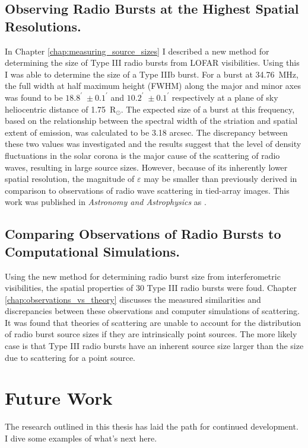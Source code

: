 \subsection{Observing Radio Bursts at the Highest Spatial Resolutions.}
In Chapter \ref{chap:measuring_source_sizes} I described a new method for determining the size of Type III radio bursts from LOFAR visibilities. Using this I was able to determine the size of a Type IIIb burst. For a burst at 34.76~MHz, the full width at half maximum height (FWHM) along the major and minor axes was found to be $18.8^\prime$~$\pm~0.1^\prime$ and $10.2^\prime$~$\pm~0.1^\prime$ respectively at a plane of sky heliocentric distance of 1.75~R$_\odot$. The expected size of a burst at this frequency, based on the relationship between the spectral width of the striation and spatial extent of emission, was calculated to be 3.18 arcsec. The discrepancy between these two values was investigated and the results suggest that the level of density fluctuations in the solar corona is the major cause of the scattering of radio waves, resulting in large source sizes. However, because of its inherently lower spatial resolution, the magnitude of $\varepsilon$ may be smaller than previously derived in comparison to observations of radio wave scattering in tied-array images. This work was published in \textit{Astronomy and Astrophysics} as \cite{Murphy2021}.

\subsection{Comparing Observations of Radio Bursts to Computational Simulations.}
Using the new method for determining radio burst size from interferometric visibilities, the spatial properties of 30 Type III radio bursts were foud. Chapter \ref{chap:observations_vs_theory} discusses the measured similarities and discrepancies between these observations and computer simulations of scattering. It was found that theories of scattering are unable to account for the distribution of radio burst source sizes if they are intrinsically point sources. The more likely case is that Type III radio bursts have an inherent source size larger than the size due to scattering for a point source.

\section{Future Work}
The research outlined in this thesis has laid the path for continued development. I dive some examples of what's next here.

